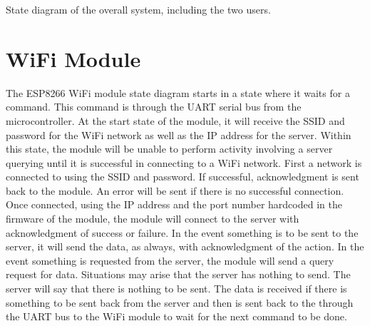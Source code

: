 \documentclass{article}
\begin{document}
\begin{center}
State diagram of the overall system, including the two users.
\end{center}

\vspace*{5mm}
	
\section*{WiFi Module}
\indent

The ESP8266 WiFi module state diagram starts in a state where it waits for a command. This command is through the UART serial bus from the microcontroller. At the start state of the module, it will receive the SSID and password for the WiFi network as well as the IP address for the server. Within this state, the module will be unable to perform activity involving a server querying until it is successful in connecting to a WiFi network. First a network is connected to using the SSID and password. If successful, acknowledgment is sent back to the module. An error will be sent if there is no successful connection. Once connected, using the IP address and the port number hardcoded in the firmware of the module, the module will connect to the server with acknowledgment of success or failure. In the event something is to be sent to the server, it will send the data, as always, with acknowledgment of the action. In the event something is requested from the server, the module will send a query request for data. Situations may arise that the server has nothing to send. The server will say that there is nothing to be sent. The data is received if there is something to be sent back from the server and then is sent back to the through the UART bus to the WiFi module to wait for the next command to be done.

\vspace*{5mm}
\end{document}
